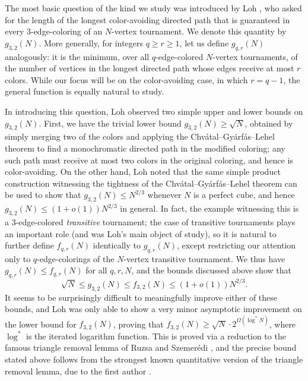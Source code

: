 \documentclass[11pt,reqno]{amsart}
\theoremstyle{definition}
\newcommand\1{\mathbf{1}}
\let\leq\leqslant
\let\geq\geqslant
\begin{document}
The most basic question of the kind we study was 
introduced by Loh \cite{1505.07312}, who asked for the length of the longest color-avoiding directed path that is guaranteed in every $3$-edge-coloring of an $N$-vertex tournament. We denote this quantity by $g_{3,2}(N)$. More generally, for integers $q \geq r \geq 1$, let us define $g_{q,r}(N)$ analogously: it is the minimum, over all $q$-edge-colored $N$-vertex tournaments, of the number of vertices in the longest directed path whose edges receive at most $r$ colors. While our focus will be on the color-avoiding case, in which $r=q-1$, the general function is equally natural to study.

In introducing this question, Loh observed two simple upper and lower bounds on $g_{3,2}(N)$. First, we have the trivial lower bound $g_{3,2}(N) \geq \sqrt N$, 
obtained by simply merging two of the colors and applying the Chv\'atal--Gy\'arf\'as--Lehel theorem to find a monochromatic directed path in the modified coloring; any such path must receive at most two colors in the original coloring, and hence is color-avoiding. On the other hand, Loh noted that the same simple product construction witnessing the tightness of the Chv\'atal--Gy\'arf\'as--Lehel theorem can be used to show that $g_{3,2}(N) \leq N^{2/3}$ whenever $N$ is a perfect cube, and hence $g_{3,2}(N) \leq (1+o(1))N^{2/3}$ in general. In fact, the example witnessing this is a $3$-edge-colored \emph{transitive} tournament; the case of transitive tournaments plays an important role (and was Loh's main object of study), so it is natural to further define $f_{q,r}(N)$ identically to $g_{q,r}(N)$, except restricting our attention only to $q$-edge-colorings of the $N$-vertex transitive tournament. We thus have $g_{q,r}(N) \leq f_{q,r}(N)$ for all $q,r,N$, and the bounds discussed above show that
\begin{equation}\label{eq:32 bounds}
    \sqrt N \leq g_{3,2}(N) \leq f_{3,2}(N) \leq (1+o(1))N^{2/3}.
\end{equation}
It seems to be surprisingly difficult to meaningfully improve either of these bounds, and Loh was only able to show a very minor asymptotic improvement on the lower bound for $f_{3,2}(N)$, proving that $f_{3,2}(N) \geq \sqrt N \cdot 2^{\Omega(\log^* N)}$, where $\log^*$ is the iterated logarithm function. This is proved via a reduction to the famous triangle removal lemma of Ruzsa and Szemer\'edi \cite{MR519318}, and the precise bound stated above follows from the strongest known quantitative version of the triangle removal lemma, due to the first author \cite{MR2811609}. 
\end{document}
